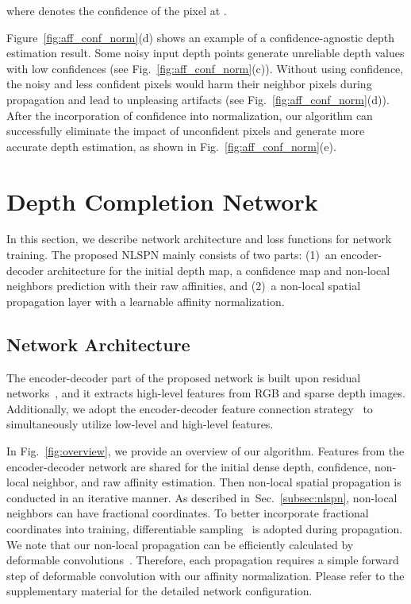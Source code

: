 \documentclass[runningheads]{llncs}
\newcommand{\figref}[1]{Fig.~\ref{#1}}
\newcommand{\secref}[1]{Sec.~\ref{#1}}
\newcommand{\Figref}[1]{Figure~\ref{#1}}
\begin{document}
where  denotes the confidence of the pixel at . 


\Figref{fig:aff_conf_norm}(d) shows an example of a confidence-agnostic depth estimation result. 
Some noisy input depth points generate unreliable depth values with low confidences (see \figref{fig:aff_conf_norm}(c)). 
Without using confidence, the noisy and less confident pixels would harm their neighbor pixels during propagation and lead to unpleasing artifacts (see \figref{fig:aff_conf_norm}(d)).
After the incorporation of confidence into normalization, our algorithm can successfully eliminate the impact of unconfident pixels and generate more accurate depth estimation, as shown in \figref{fig:aff_conf_norm}(e).





\section{Depth Completion Network}
\label{sec:implementation}
In this section, we describe network architecture and loss functions for network training. 
The proposed NLSPN mainly consists of two parts: (1)~an encoder-decoder architecture for the initial depth map, a confidence map and non-local neighbors prediction with their raw affinities, and (2)~a non-local spatial propagation layer with a learnable affinity normalization.



\subsection{Network Architecture}
\label{subsec:net_arch}

The encoder-decoder part of the proposed network is built upon residual networks~\cite{he2016deep}, and it extracts high-level features from RGB and sparse depth images. 
Additionally, we adopt the encoder-decoder feature connection strategy~\cite{ronneberger2015u,cheng2018depth} to simultaneously utilize low-level and high-level features.



In \figref{fig:overview}, we provide an overview of our algorithm. 
Features from the encoder-decoder network are shared for the initial dense depth, confidence, non-local neighbor, and raw affinity estimation. 
Then non-local spatial propagation is conducted in an iterative manner. 
As described in~\secref{subsec:nlspn}, non-local neighbors can have fractional coordinates. 
To better incorporate fractional coordinates into training, differentiable sampling~\cite{jaderberg2015spatial,zhu2019deformable} is adopted during propagation. 
We note that our non-local propagation can be efficiently calculated by deformable convolutions~\cite{zhu2019deformable}. 
Therefore, each propagation requires a simple forward step of deformable convolution with our affinity normalization. 
Please refer to the supplementary material for the detailed network configuration.
\end{document}
